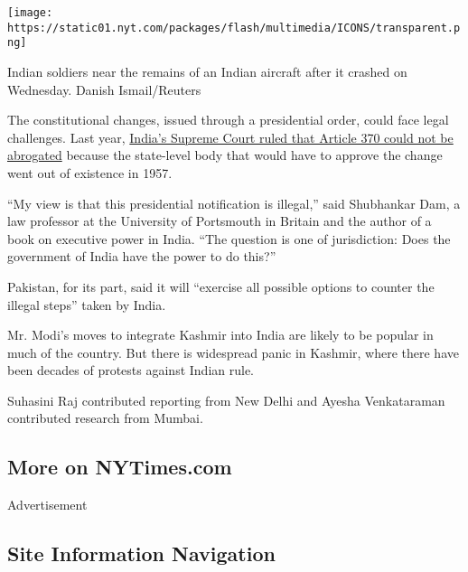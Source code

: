 \texttt{[image: https://static01.nyt.com/packages/flash/multimedia/ICONS/transparent.png]}

Indian soldiers near the remains of an Indian aircraft after it crashed
on Wednesday. Danish Ismail/Reuters

The constitutional changes, issued through a presidential order, could
face legal challenges. Last year,
\href{https://timesofindia.indiatimes.com/india/article-370-has-acquired-permanent-status-supreme-court/articleshow/63603527.cms}{India's
Supreme Court ruled that Article 370 could not be abrogated} because the
state-level body that would have to approve the change went out of
existence in 1957.

``My view is that this presidential notification is illegal,'' said
Shubhankar Dam, a law professor at the University of Portsmouth in
Britain and the author of a book on executive power in India. ``The
question is one of jurisdiction: Does the government of India have the
power to do this?''

Pakistan, for its part, said it will ``exercise all possible options to
counter the illegal steps'' taken by India.

Mr. Modi's moves to integrate Kashmir into India are likely to be
popular in much of the country. But there is widespread panic in
Kashmir, where there have been decades of protests against Indian rule.

Suhasini Raj contributed reporting from New Delhi and Ayesha
Venkataraman contributed research from Mumbai.

\hypertarget{more-on-nytimescom}{%
\subsection{More on NYTimes.com}\label{more-on-nytimescom}}

Advertisement

\hypertarget{site-information-navigation}{%
\subsection{Site Information
Navigation}\label{site-information-navigation}}

